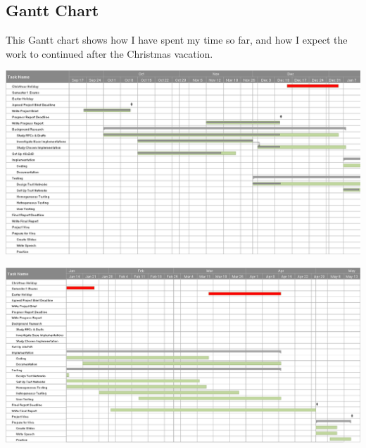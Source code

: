 \documentclass[12pt]{report}
\begin{document}
\begin{landscape}

\section{Gantt Chart}
This Gantt chart shows how I have spent my time so far, and how I expect the
work to continued after the Christmas vacation.

\begin{center}
\includegraphics[width=\linewidth]{../Gantt/GanttPart1.png}
\end{center}

\begin{center}
\includegraphics[width=\linewidth]{../Gantt/GanttPart2.png}
\end{center}

\end{landscape}

\pagebreak

\printnomenclature

\pagebreak


{}

\end{document}
